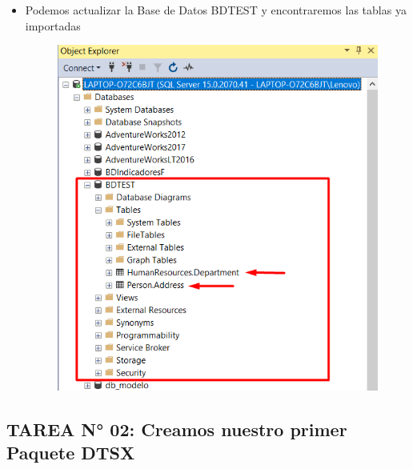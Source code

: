 \documentclass[12pt,letterpaper]{article}
\begin{document}
\begin{itemize}
\item Podemos actualizar la Base de Datos BDTEST y encontraremos las tablas ya importadas
	\begin{figure}[htb]
		\begin{center}
			\includegraphics[width=12cm]{./IMAGENES/Tarea1_11}
		\end{center}
	\end{figure}

\end{itemize}

\newpage


\subsection{TAREA N° 02: Creamos nuestro primer Paquete DTSX}
\end{document}
